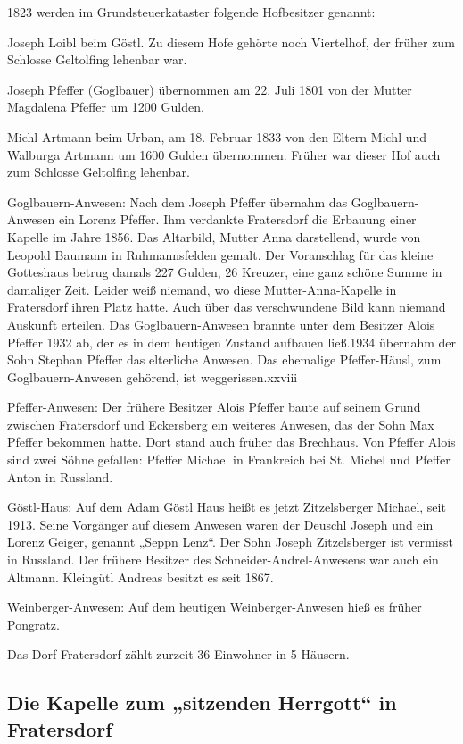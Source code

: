\documentclass{book}
\begin{document}
1823 werden im Grundsteuerkataster folgende Hofbesitzer genannt:



Joseph Loibl beim Göstl. Zu diesem Hofe gehörte noch Viertelhof, der früher zum
Schlosse Geltolfing lehenbar war.

Joseph Pfeffer (Goglbauer) übernommen am 22. Juli 1801 von der Mutter Magdalena
Pfeffer um 1200 Gulden.

Michl Artmann beim Urban, am 18. Februar 1833 von den Eltern Michl und Walburga
Artmann um 1600 Gulden übernommen. Früher war dieser Hof auch zum Schlosse
Geltolfing lehenbar.



Goglbauern-Anwesen: Nach dem Joseph Pfeffer übernahm das Goglbauern-Anwesen ein
Lorenz Pfeffer. Ihm verdankte Fratersdorf die Erbauung einer Kapelle im Jahre
1856. Das Altarbild, Mutter Anna darstellend, wurde von Leopold Baumann in
Ruhmannsfelden gemalt. Der Voranschlag für das kleine Gotteshaus betrug damals
227 Gulden, 26 Kreuzer, eine ganz schöne Summe in damaliger Zeit. Leider weiß
niemand, wo diese Mutter-Anna-Kapelle in Fratersdorf ihren Platz hatte. Auch
über das verschwundene Bild kann niemand Auskunft erteilen. Das
Goglbauern-Anwesen brannte unter dem Besitzer Alois Pfeffer 1932 ab, der es in
dem heutigen Zustand aufbauen ließ.1934 übernahm der Sohn Stephan Pfeffer das
elterliche Anwesen. Das ehemalige Pfeffer-Häusl, zum Goglbauern-Anwesen
gehörend, ist weggerissen.xxviii

Pfeffer-Anwesen: Der frühere Besitzer Alois Pfeffer baute auf seinem Grund
zwischen Fratersdorf und Eckersberg ein weiteres Anwesen, das der Sohn Max
Pfeffer bekommen hatte. Dort stand auch früher das Brechhaus. Von Pfeffer Alois
sind zwei Söhne gefallen: Pfeffer Michael in Frankreich bei St. Michel und
Pfeffer Anton in Russland.

Göstl-Haus: Auf dem Adam Göstl Haus heißt es jetzt Zitzelsberger Michael, seit
1913. Seine Vorgänger auf diesem Anwesen waren der Deuschl Joseph und ein Lorenz
Geiger, genannt „Seppn Lenz“. Der Sohn Joseph Zitzelsberger ist vermisst in
Russland. Der frühere Besitzer des Schneider-Andrel-Anwesens war auch ein
Altmann. Kleingütl Andreas besitzt es seit 1867.

Weinberger-Anwesen: Auf dem heutigen Weinberger-Anwesen hieß es früher Pongratz.

Das Dorf Fratersdorf zählt zurzeit 36 Einwohner in 5 Häusern.

\subsection{Die Kapelle zum „sitzenden Herrgott“ in Fratersdorf}
\end{document}
